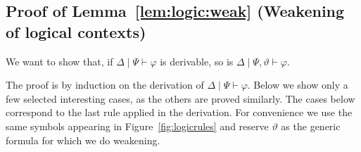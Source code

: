 \documentclass[a4paper,UKenglish,cleveref, autoref, thm-restate]{lipics-v2021}
\newcommand{\logicJ}[3][\Delta]{#1 \mid #2 \vdash #3}
\begin{document}
\subsection*{Proof of Lemma~\ref{lem:logic:weak} (Weakening of logical contexts)}
We want to show that, 
{\centering
if $\logicJ[\Delta]{\Psi}{\varphi}$ is derivable, 
so is $\logicJ[\Delta]{\Psi, \vartheta}{\varphi}$.
}

The proof is by induction on the derivation of $\logicJ{\Psi}{\varphi}$.
Below we show only a few selected interesting cases, as the others are proved similarly.
The cases below correspond to the last rule applied in the derivation. For convenience we use the same symbols appearing in Figure~\ref{fig:logicrules}
and reserve $\vartheta$ as the generic formula for which we do weakening.
\end{document}
